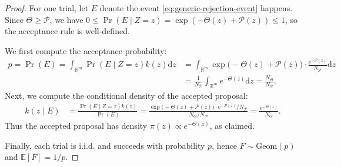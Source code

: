 \documentclass[11pt,letterpaper]{article}
\newcommand{\R}{\mathbb{R}}
\newcommand{\E}{\mathbb{E}}
\newcommand{\D}{\mathrm{d}}
\begin{document}
\begin{proof}
For one trial, let $E$ denote the event \eqref{eq:generic-rejection-event} happens.
Since $\Theta\ge \mathcal{P}$, we have $0\le \Pr(E\mid Z=z)=\exp(-\Theta(z)+\mathcal{P}(z))\le 1$,
so the acceptance rule is well-defined.

We first compute the acceptance probability:
\begin{align*}
p=\Pr(E)
=\int_{\R^m}\Pr(E\mid Z=z) k(z)  \D z &=\int_{\R^m}\exp\bigl(-\Theta(z)+\mathcal{P}(z)\bigr)\cdot \frac{e^{-\mathcal{P}(z)}}{N_{\mathcal{P}}}  \D z \\
&=\frac{1}{N_{\mathcal{P}}}\int_{\R^m}e^{-\Theta(z)}  \D z
=\frac{N_\Theta}{N_{\mathcal{P}}}.
\end{align*}
Next, we compute the conditional density of the accepted proposal:
\begin{align*}
k(z\mid E)
&=\frac{\Pr(E\mid Z=z) k(z)}{\Pr(E)} =\frac{\exp\bigl(-\Theta(z)+\mathcal{P}(z)\bigr)\cdot e^{-\mathcal{P}(z)}/N_{\mathcal{P}}}{N_\Theta/N_{\mathcal{P}}}
=\frac{e^{-\Theta(z)}}{N_\Theta}.
\end{align*}
Thus the accepted proposal has density $\pi(z)\propto e^{-\Theta(z)}$, as claimed.

Finally, each trial is i.i.d. and succeeds with probability $p$, hence $F\sim\mathrm{Geom}(p)$ and
$\E[F]=1/p$.
\end{proof}
\end{document}
